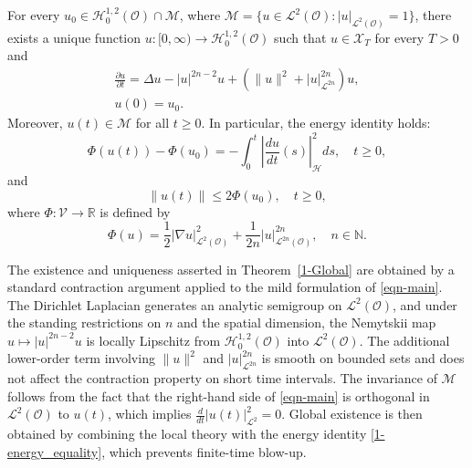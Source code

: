 \documentclass[reqno]{amsart}
\begin{document}
\begin{theorem}
\label{1-Global}
For every $u_{0} \in \mathcal{H}_{0}^{1,2}(\mathcal{O}) \cap \mathcal{M}$, where
$\mathcal{M} = \{ u \in \mathcal{L}^{2}(\mathcal{O}) : |u|_{\mathcal{L}^{2}(\mathcal{O})}
 = 1 \}$,
there exists a unique function $u : [0, \infty) \to \mathcal{H}_{0}^{1,2}(\mathcal{O})$
such that $u \in \mathcal{X}_{T}$ for every $T > 0$ and
\begin{equation}\label{eqn-main}
\begin{gathered}
\frac{\partial u}{\partial t} = \Delta u - |u|^{2n-2} u + \left( \|u\|^{2} + |u|_{\mathcal{L}^{2n}}^{2n} \right) u, \\
u(0) = u_{0}.
\end{gathered}
\end{equation}
Moreover, $u(t) \in \mathcal{M}$ for all $t \ge 0$. In particular, the energy
identity holds:
\begin{equation}
\Phi(u(t)) - \Phi(u_{0}) = -\int_{0}^{t} | \frac{du}{dt}(s) |_{\mathcal{H}}^{2}  ds,
\quad t \ge 0,
\label{1-energy_equality}
\end{equation}
and
\[
\|u(t)\| \le 2 \Phi(u_{0}), \quad t \ge 0,
\]
where $\Phi : \mathcal{V} \to \mathbb{R}$ is defined by
\[
\Phi(u) = \frac{1}{2} |\nabla u|_{\mathcal{L}^2(\mathcal{O})}^{2}
+ \frac{1}{2n} |u|_{\mathcal{L}^{2n}(\mathcal{O})}^{2n}, \quad n \in \mathbb{N}.
\]
\end{theorem}

\begin{remark} \rm
The existence and uniqueness asserted in Theorem~\ref{1-Global} are obtained by
a standard contraction argument applied to the mild formulation of \eqref{eqn-main}.
The Dirichlet Laplacian generates an analytic semigroup on
$\mathcal{L}^{2}(\mathcal{O})$,
and under the standing restrictions on $n$ and the spatial dimension, the Nemytskii map
$u\mapsto |u|^{2n-2}u$ is locally Lipschitz from $\mathcal{H}_{0}^{1,2}(\mathcal{O})$
into $\mathcal{L}^{2}(\mathcal{O})$.
The additional lower-order term involving $\|u\|^{2}$ and $|u|_{\mathcal{L}^{2n}}^{2n}$
is smooth on bounded sets and does not affect the contraction property on short time intervals.
The invariance of $\mathcal{M}$ follows from the fact that the right-hand side of
\eqref{eqn-main} is orthogonal in $\mathcal{L}^{2}(\mathcal{O})$ to $u(t)$, which implies
$\frac{d}{dt}|u(t)|_{\mathcal{L}^{2}}^{2}=0$.
Global existence is then obtained by combining the local theory with the energy identity
\eqref{1-energy_equality}, which prevents finite-time blow-up.
\end{remark}
\end{document}
